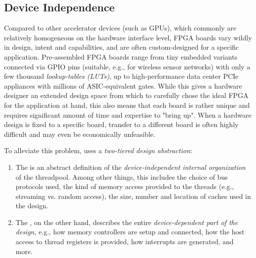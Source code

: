 \subsection*{Device Independence}\label{sec:device-independency}%
Compared to other accelerator devices (such as GPUs), which commonly are relatively homogeneous on the hardware interface level, FPGA boards vary wildly in design, intent and capabilities, and are often custom-designed for a specific application.
Pre-assembled FPGA boards range from tiny embedded variants connected via GPIO pins (suitable, e.g., for wireless sensor networks) with only a few thousand \emph{lookup-tables (LUTs)}, up to high-performance data center PCIe appliances with millions of ASIC-equivalent gates.
While this gives a hardware designer an extended design space from which to carefully chose the ideal FPGA for the application at hand, this also means that each board is rather unique and requires significant amount of time and expertise to "bring up".
When a hardware design is fixed to a specific board, transfer to a different board is often highly difficult and may even be economically unfeasible.

\medskip
To alleviate this problem, \tapasco{} uses a \emph{two-tiered design abstraction}:

\begin{enumerate}
  \item The  is an abstract definition of the \emph{device-independent internal organization} of the threadpool. Among other things, this includes the choice of bus protocols used, the kind of memory access provided to the threads (e.g., streaming vs. random access), the size, number and location of caches used in the design. 
  \item The , on the other hand, describes the entire \emph{device-dependent part of the design}, e.g., how memory controllers are setup and connected, how the host access to thread registers is provided, how interrupts are generated, and more.
\end{enumerate}

